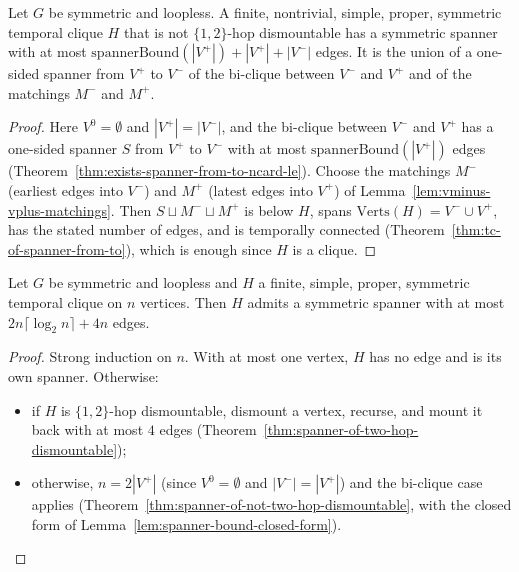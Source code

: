 \begin{theorem}
  \label{thm:spanner-of-not-two-hop-dismountable}
  \leanok
  Let $G$ be symmetric and loopless. A finite, nontrivial, simple, proper,
  symmetric temporal clique $H$ that is not $\{1,2\}$-hop dismountable has a
  symmetric spanner with at most
  $\mathrm{spannerBound}(|V^+|) + |V^+| + |V^-|$ edges. It is the union of a
  one-sided spanner from $V^+$ to $V^-$ of the bi-clique between $V^-$ and
  $V^+$ and of the matchings $M^-$ and $M^+$.
\end{theorem}

\begin{proof}
  \leanok
  Here $V^0 = \emptyset$ and $|V^+| = |V^-|$, and the bi-clique between $V^-$ and $V^+$ has a one-sided spanner $S$ from $V^+$ to $V^-$ with at most $\mathrm{spannerBound}(|V^+|)$ edges (Theorem~\ref{thm:exists-spanner-from-to-ncard-le}). Choose the matchings $M^-$ (earliest edges into $V^-$) and $M^+$ (latest edges into $V^+$) of Lemma~\ref{lem:vminus-vplus-matchings}. Then $S \sqcup M^- \sqcup M^+$ is below $H$, spans $\mathrm{Verts}(H) = V^- \cup V^+$, has the stated number of edges, and is temporally connected (Theorem~\ref{thm:tc-of-spanner-from-to}), which is enough since $H$ is a clique.
\end{proof}

\begin{theorem}
  \label{thm:clique-spanner-ncard-le}
  \leanok
  Let $G$ be symmetric and loopless and $H$ a finite, simple, proper,
  symmetric temporal clique on $n$ vertices. Then $H$ admits a symmetric
  spanner with at most $2n\lceil\log_2 n\rceil + 4n$ edges.
\end{theorem}

\begin{proof}
  \leanok
  Strong induction on $n$. With at most one vertex, $H$ has no edge and is its
  own spanner. Otherwise:
  \begin{itemize}
    \item if $H$ is $\{1,2\}$-hop dismountable, dismount a vertex, recurse,
      and mount it back with at most $4$ edges
      (Theorem~\ref{thm:spanner-of-two-hop-dismountable});
    \item otherwise, $n = 2|V^+|$ (since $V^0 = \emptyset$ and
      $|V^-| = |V^+|$) and the bi-clique case applies
      (Theorem~\ref{thm:spanner-of-not-two-hop-dismountable}, with the closed
      form of Lemma~\ref{lem:spanner-bound-closed-form}).
  \end{itemize}
\end{proof}
